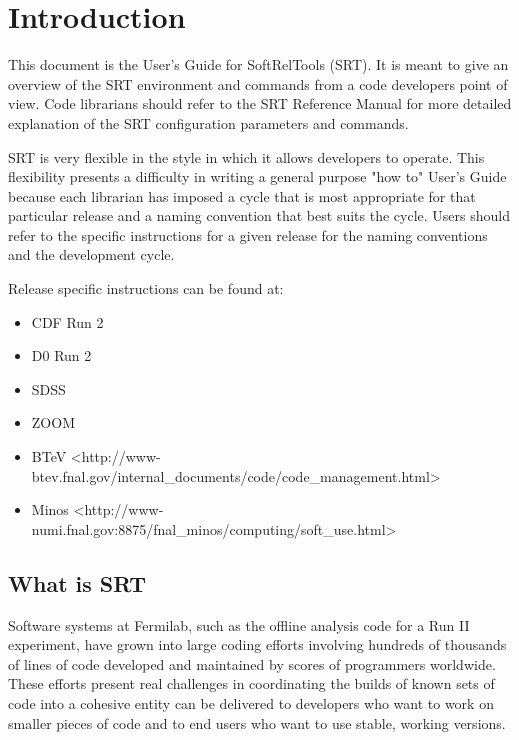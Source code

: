 \documentclass[12pt]{article}
\begin{document}
%
%

\clearpage
\section{Introduction}

This document is the User's Guide for SoftRelTools (SRT). It is meant
to give an overview of the SRT environment and commands
from a code developers point
of view. Code librarians  should refer to the SRT Reference Manual for
more detailed explanation of the SRT configuration parameters and commands. 

SRT is very flexible in the style in which it allows developers to operate. 
This flexibility presents a difficulty in writing a general purpose "how to"
User's Guide because each librarian has imposed a cycle that is most 
appropriate for that particular release and a naming convention that
best suits the cycle. Users should refer to the specific instructions 
for a given release for the naming conventions and the development cycle. 

Release specific instructions can be found at:
\begin{itemize}
\item CDF Run 2
\item D0 Run 2
\item SDSS
\item ZOOM
\item BTeV <http://www-btev.fnal.gov/internal\_documents/code/code\_management.html>
\item Minos <http://www-numi.fnal.gov:8875/fnal\_minos/computing/soft\_use.html>
\end{itemize}

\subsection{What is SRT} 

Software systems at Fermilab, such as the offline analysis code for a Run II experiment, 
have grown into large coding efforts involving hundreds of thousands of lines of code 
developed and maintained by scores of programmers worldwide. These efforts 
present real challenges in coordinating the builds of known sets of code into
a cohesive entity can be delivered to developers who want to work on smaller
pieces of code and to end users who want to use stable, working versions. 
\end{document}
